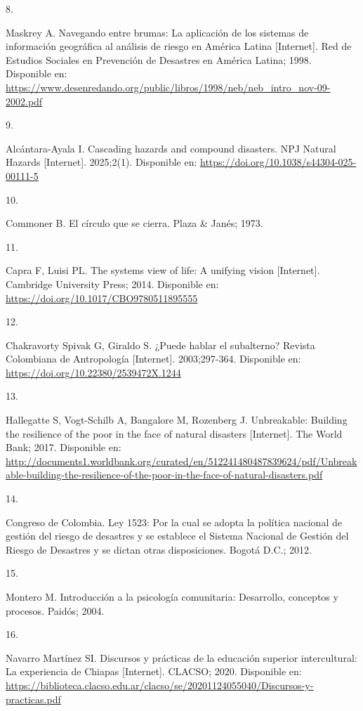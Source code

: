 \documentclass[
  spanish,
  letterpaper,
]{book}
\newlength{\cslhangindent}
\newlength{\csllabelwidth}
\newenvironment{CSLReferences}[2] %
 {\begin{list}{}{%
  \setlength{\itemindent}{0pt}
  \setlength{\leftmargin}{0pt}
  \setlength{\parsep}{0pt}
  \ifodd #1
   \setlength{\leftmargin}{\cslhangindent}
   \setlength{\itemindent}{-1\cslhangindent}
  \fi
  \setlength{\itemsep}{#2\baselineskip}}}
 {\end{list}}
\newcommand{\CSLLeftMargin}[1]{\parbox[t]{\csllabelwidth}{\strut#1\strut}}
\newcommand{\CSLRightInline}[1]{\parbox[t]{\linewidth - \csllabelwidth}{\strut#1\strut}}
\begin{document}
\begin{CSLReferences}{0}{1}
\CSLLeftMargin{8. }%
\CSLRightInline{Maskrey A. Navegando entre brumas: La aplicación de los
sistemas de información geográfica al análisis de riesgo en América
Latina {[}Internet{]}. Red de Estudios Sociales en Prevención de
Desastres en América Latina; 1998. Disponible en:
\url{https://www.desenredando.org/public/libros/1998/neb/neb_intro_nov-09-2002.pdf}}

\CSLLeftMargin{9. }%
\CSLRightInline{Alcántara-Ayala I. Cascading hazards and compound
disasters. NPJ Natural Hazards {[}Internet{]}. 2025;2(1). Disponible en:
\url{https://doi.org/10.1038/s44304-025-00111-5}}

\CSLLeftMargin{10. }%
\CSLRightInline{Commoner B. El círculo que se cierra. Plaza \& Janés;
1973. }

\CSLLeftMargin{11. }%
\CSLRightInline{Capra F, Luisi PL. The systems view of life: A unifying
vision {[}Internet{]}. Cambridge University Press; 2014. Disponible en:
\url{https://doi.org/10.1017/CBO9780511895555}}

\CSLLeftMargin{12. }%
\CSLRightInline{Chakravorty Spivak G, Giraldo S. ¿Puede hablar el
subalterno? Revista Colombiana de Antropología {[}Internet{]}.
2003;297-364. Disponible en:
\url{https://doi.org/10.22380/2539472X.1244}}

\CSLLeftMargin{13. }%
\CSLRightInline{Hallegatte S, Vogt-Schilb A, Bangalore M, Rozenberg J.
Unbreakable: Building the resilience of the poor in the face of natural
disasters {[}Internet{]}. The World Bank; 2017. Disponible en:
\url{http://documents1.worldbank.org/curated/en/512241480487839624/pdf/Unbreakable-building-the-resilience-of-the-poor-in-the-face-of-natural-disasters.pdf}}

\CSLLeftMargin{14. }%
\CSLRightInline{Congreso de Colombia. Ley 1523: Por la cual se adopta la
política nacional de gestión del riesgo de desastres y se establece el
Sistema Nacional de Gestión del Riesgo de Desastres y se dictan otras
disposiciones. Bogotá D.C.; 2012. }

\CSLLeftMargin{15. }%
\CSLRightInline{Montero M. Introducción a la psicología comunitaria:
Desarrollo, conceptos y procesos. Paidós; 2004. }

\CSLLeftMargin{16. }%
\CSLRightInline{Navarro Martínez SI. Discursos y prácticas de la
educación superior intercultural: La experiencia de Chiapas
{[}Internet{]}. CLACSO; 2020. Disponible en:
\url{https://biblioteca.clacso.edu.ar/clacso/se/20201124055040/Discursos-y-practicas.pdf}}


\end{CSLReferences}
\end{document}
